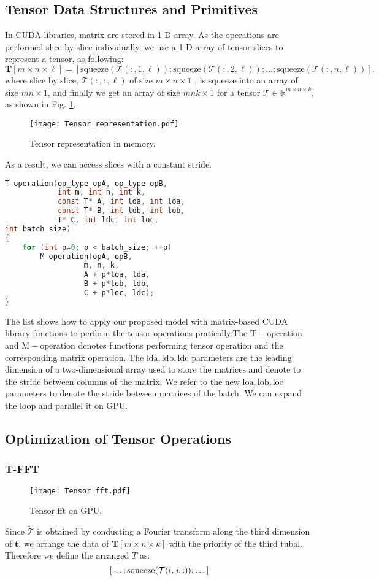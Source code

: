 \documentclass[format=acmsmall, review=false, screen=true]{acmart}
\begin{document}
\subsection{Tensor Data Structures and Primitives}
In CUDA libraries, matrix are stored in 1-D array. 
As the operations are performed slice by slice individually, 
 we use a 1-D array of tensor slices to represent a tensor, as following:
\[
    \mathbf{T}[m \times n \times \ell] = [\mathrm{squeeze}(\mathcal{T}(:, 1, \ell)); \mathrm{squeeze}(\mathcal{T}(:, 2, \ell)); \dots; \mathrm{squeeze}(\mathcal{T}(:, n, \ell))] ,
\]
where slice by slice, $\mathcal{T}(:, :, \ell)$ of size $ m \times n \times
1$ , is squeeze into an array of size $ mn \times 1$, and finally we get
an array of size $mnk \times 1$ for a tensor $\mathcal{T} \in
\mathbb{R}^{m \times
n \times k}$, as shown in Fig. \ref{pic_tensor_representation}.
\begin{figure}[t]
    \centering
    \texttt{[image: Tensor\_representation.pdf]}
    \caption{Tensor representation in memory.}
    \label{pic_tensor_representation}
\end{figure}
As a result, we can access slices with a constant stride. 
\begin{lstlisting}[language=C]
T-operation(op_type opA, op_type opB,
            int m, int n, int k,
            const T* A, int lda, int loa,
            const T* B, int ldb, int lob,
            T* C, int ldc, int loc,
int batch_size)
{
    for (int p=0; p < batch_size; ++p)
        M-operation(opA, opB,
                  m, n, k,
                  A + p*loa, lda,
                  B + p*lob, ldb,
                  C + p*loc, ldc);
}
\end{lstlisting}
The list shows how to apply our proposed model with matrix-based CUDA library functions to perform the tensor operations pratically.The $\mathrm{T-operation}$ and $\mathrm{M-operation}$ denotes functions performing tensor operation and the corresponding matrix operation.
The $\mathrm{lda, ldb, ldc}$ parameters are the leading dimension of a two-dimensional array used to store the matrices and denote to the stride between columns of the matrix. We refer to the new $\mathrm{loa, lob, loc}$ parameters to denote the stride between matrices of the batch. We can expand the loop and parallel it on GPU.
\subsection{Optimization of Tensor Operations}
\subsubsection{T-FFT}
\label{SEC_Tensor_FFT}
\begin{figure}[t]
    \centering
    \texttt{[image: Tensor\_fft.pdf]}
    \caption{Tensor fft on GPU.}
    \label{TensorFFT}
\end{figure}
  Since $\widetilde{\mathcal{T}}$ is obtained by conducting a Fourier transform along the third dimension of $\mathbf{t}$, we arrange the data of $\mathbf{T}[m \times n \times k]$ with the priority of the third tubal. Therefore we define the arranged $T$ as:
\[
 [\dots; \mathrm{squeeze}(\mathcal{T}(i, j, :)); \dots]\notag
\]
\end{document}
